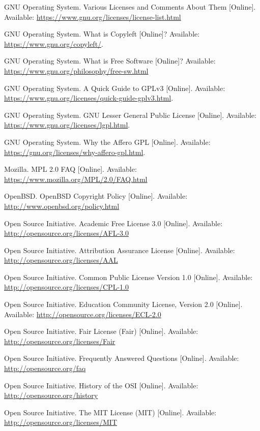 \documentclass[12pt,letterpaper]{article}
\begin{document}
\begin{thebibliography}{20}
 GNU Operating System. Various Licenses and Comments About Them [Online]. Available: \url{https://www.gnu.org/licenses/license-list.html}

 GNU Operating System. What is Copyleft [Online]? Available: \url{https://www.gnu.org/copyleft/}.

 GNU Operating System. What is Free Software [Online]? Available: \url{https://www.gnu.org/philosophy/free-sw.html}

 GNU Operating System. A Quick Guide to GPLv3 [Online]. Available: \url{https://www.gnu.org/licenses/quick-guide-gplv3.html}.

 GNU Operating System. GNU Lesser General Public License [Online]. Available: \url{https://www.gnu.org/licenses/lgpl.html}.

 GNU Operating System. Why the Affero GPL [Online]. Available: \url{https://gnu.org/licenses/why-affero-gpl.html}.

 Mozilla. MPL 2.0 FAQ [Online]. Available: \url{https://www.mozilla.org/MPL/2.0/FAQ.html}

 OpenBSD. OpenBSD Copyright Policy [Online]. Available: \url{http://www.openbsd.org/policy.html}

 Open Source Initiative. Academic Free License 3.0 [Online]. Available: \url{http://opensource.org/licenses/AFL-3.0}

 Open Source Initiative. Attribution Assurance License [Online]. Available: \url{http://opensource.org/licenses/AAL}

 Open Source Initiative. Common Public License Version 1.0 [Online]. Available: \url{http://opensource.org/licenses/CPL-1.0}

 Open Source Initiative. Education Community License, Version 2.0 [Online]. Available: \url{http://opensource.org/licenses/ECL-2.0}

 Open Source Initiative. Fair License (Fair) [Online]. Available: \url{http://opensource.org/licenses/Fair}

 Open Source Initiative. Frequently Answered Questions [Online]. Available: \url{http://opensource.org/faq}

 Open Source Initiative. History of the OSI [Online]. Available: \url{http://opensource.org/history}

 Open Source Initiative. The MIT License (MIT) [Online]. Available: \url{http://opensource.org/licenses/MIT}


\end{thebibliography}
\end{document}
